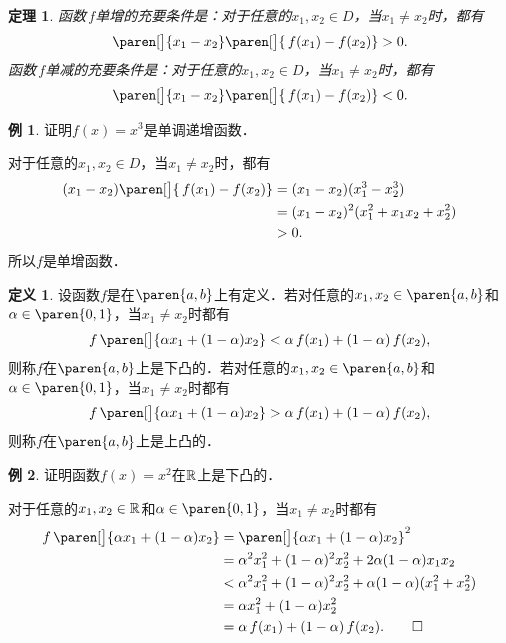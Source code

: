 \documentclass[a4paper,punct=CCT]{ctexbook}
\makeatletter
\newtheorem*{theorem*}{定理}
\theoremstyle{definition}
\newtheorem*{definition*}{定义}
\newtheorem*{example*}{例}
\theoremstyle{remark}
\renewcommand*{\proofname}{证}
\renewenvironment{proof}[1][\proofname]{\par
  \pushQED{\qed}%
  \normalfont \topsep6\p@\@plus6\p@\relax
  \trivlist
  \item[\hskip\labelsep
    \bfseries
    #1%
    ]\ignorespaces
}{%
  \popQED\endtrivlist\@endpefalse
}
\makeatother
\begin{document}
\begin{theorem*}
  函数\(\,f\)单增的充要条件是：对于任意的\(x_1, x_2 \in D\)，当\(x_1 \ne x_2\)时，都有
  \begin{equation*}
    \paren[\big]{x_1 - x_2}\paren[\big]{\,f(x_1) - f(x_2)} > 0.
  \end{equation*}
  函数\(\,f\)单减的充要条件是：对于任意的\(x_1, x_2 \in D\)，当\(x_1 \ne x_2\)时，都有
  \begin{equation*}
    \paren[\big]{x_1 - x_2}\paren[\big]{\,f(x_1) - f(x_2)} < 0.
  \end{equation*}
\end{theorem*}

\begin{example*}
  证明\(f(x) = x^3\)是单调递增函数．

  \begin{proof}
    对于任意的\(x_1, x_2 \in D\)，当\(x_1 \ne x_2\)时，都有
    \[
      \begin{split}
        (x_1 - x_2) \paren[\big]{\,f(x_1) - f(x_2)}
        &= (x_1 - x_2) (x_1^3 - x_2^3) \\
        &= (x_1 - x_2)^2 (x_1^2 + x_1 x_2 + x_2^2) \\
        &> 0.
      \end{split}
    \]
    所以\(f\)是单增函数．
  \end{proof}
\end{example*}

\begin{definition*}
  设函数\(f\)是在\(\paren{a,b}\)上有定义．若对任意的\(x_1, x_2 \in \paren{a,b}\)和\(\alpha \in \paren{0,1}\)，当\(x_1 \ne x_2\)时都有
  \[
    f\,\paren[\big]{\alpha x_1 + (1-\alpha) x_2} < \alpha\,f(x_1) + (1-\alpha)\,f(x_2),
  \]
  则称\(f\)在\(\paren{a,b}\)上是下凸的．若对任意的\(x_1, x_2 \in \paren{a,b}\)和\(\alpha \in \paren{0,1}\)，当\(x_1 \ne x_2\)时都有
  \[
    f\,\paren[\big]{\alpha x_1 + (1-\alpha) x_2} > \alpha\,f(x_1) + (1-\alpha)\,f(x_2),
  \]
  则称\(f\)在\(\paren{a,b}\)上是上凸的．
\end{definition*}

\begin{example*}
  证明函数\(f(x) = x^2\)在\(\mathbb{R}\)上是下凸的．

  \begin{proof}
    对于任意的\(x_1, x_2 \in \mathbb{R}\)和\(\alpha \in \paren{0,1}\)，当\(x_1 \ne x_2\)时都有
    \[
      \begin{split}
        f\,\paren[\big]{\alpha x_1 + (1-\alpha) x_2}
        &= \paren[\big]{\alpha x_1 + (1-\alpha) x_2}^2 \\
        &= \alpha^2 x_1^2 + (1-\alpha)^2 x_2^2 + 2 \alpha (1-\alpha) x_1 x_2 \\
        &< \alpha^2 x_1^2 + (1-\alpha)^2 x_2^2 + \alpha (1-\alpha) (x_1^2 + x_2^2) \\
        &= \alpha x_1^2 + (1-\alpha) x_2^2 \\
        &= \alpha\,f(x_1) + (1-\alpha)\,f(x_2). \qedhere
      \end{split}
    \]
  \end{proof}
\end{example*}
\end{document}
